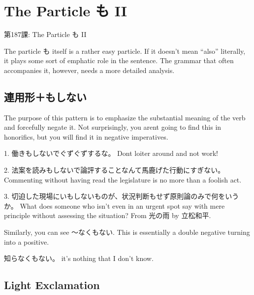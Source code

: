     
\chapter{The Particle も II}

\begin{center}
\begin{Large}
第187課: The Particle も II 
\end{Large}
\end{center}
 
\par{ The particle も itself is a rather easy particle. If it doesn't mean “also” literally, it plays some sort of emphatic role in the sentence. The grammar that often accompanies it, however, needs a more detailed analysis. }
      
\section{連用形＋もしない}
 
\par{ The purpose of this pattern is to emphasize the substantial meaning of the verb and forcefully negate it. Not surprisingly, you aren\textquotesingle t going to find this in honorifics, but you will find it in negative imperatives. }

\par{1. 働きもしないでぐずぐずするな。 \hfill\break
Don\textquotesingle t loiter around and not work! }

\par{2. 法案を読みもしないで論評することなんて馬鹿げた行動にすぎない。 \hfill\break
Commenting without having read the legislature is no more than a foolish act. }

\par{3. 切迫した現場にいもしないものが、状況判断もせず原則論のみで何をいうか。 \hfill\break
What does someone who isn't even in an urgent spot say with mere principle without assessing the situation? \hfill\break
From 光の雨 by 立松和平. }

\par{ Similarly, you can see ～なくもない. This is essentially a double negative turning into a positive. }

\par{知らなくもない。 \hfill\break
it's nothing that I don't know. }
      
\section{Light Exclamation}
 
